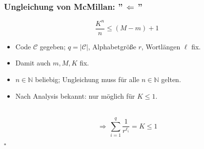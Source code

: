 \documentclass{beamer}
\begin{document}
\begin{frame}[t]
    \frametitle{Ungleichung von McMillan: ''$\,\Longleftarrow\,$''}
        $$
            \frac{K^n}{n} \leq (M-m) + 1
        $$
        \begin{itemize}
            \setlength\itemsep{1em}
            \item Code $\mathcal{C}$ gegeben; $q = |\mathcal{C}|$, Alphabetgröße $r$, Wortlängen $\ell$ fix.
            \item Damit auch $m,M,K$ fix.
            \pause
            \item $n \in \mathbb{N}$ beliebig; Ungleichung muss für alle $n \in \mathbb{N}$ gelten.
            \pause
            \item Nach Analysis bekannt: nur möglich für $K \leq 1$.
        \end{itemize}
        \strut\\[10pt]
        $$
            \,\Longrightarrow\, \sum_{i=1}^{q} \frac{1}{r^{\ell_i}} = K \leq 1
        $$
        \strut\hfill$\square$
\end{frame}
\end{document}
